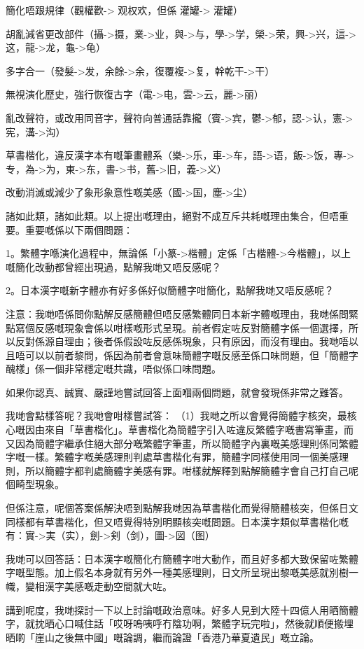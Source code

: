 \documentclass[a5paper, 10pt, openany]{book} %
\begin{document}
簡化唔跟規律（觀權歡-> 观权欢，但係 灌罐-> 灌罐）

胡亂減省更改部件（攝->摄，業->业，與->与，學->学，榮->荣，興->兴，這->这，龍->龙，龜->龟）

多字合一（發髮->发，余餘->余，復覆複->复，幹乾干->干）

無視演化歷史，強行恢復古字（電->电，雲->云，麗->丽）

亂改聲符，或改用同音字，聲符向普通話靠攏（賓->宾，鬱->郁，認->认，憲->宪，溝->沟）

草書楷化，違反漢字本有嘅筆畫體系（樂->乐，車->车，語->语，飯->饭，專->专，為->为，東->东，書->书，舊->旧，義->义）

改動消滅或減少了象形象意性嘅美感（國->国，塵->尘）

諸如此類，諸如此類。以上提出嘅理由，絕對不成互斥共耗嘅理由集合，但唔重要。重要嘅係以下兩個問題：

1。繁體字喺演化過程中，無論係「小篆->楷體」定係「古楷體->今楷體」，以上嘅簡化改動都曾經出現過，點解我哋又唔反感呢？

2。日本漢字嘅新字體亦有好多係好似簡體字咁簡化，點解我哋又唔反感呢？

注意：我哋唔係問你點解反感簡體但唔反感繁體同日本新字體嘅理由，我哋係問緊點寫個反感嘅現象會係以咁樣嘅形式呈現。前者假定咗反對簡體字係一個選擇，所以反對係源自理由；後者係假設咗反感係現象，只有原因，而沒有理由。我哋唔以且唔可以以前者黎問，係因為前者會意味簡體字嘅反感至係口味問題，但「簡體字醜樣」係一個非常穩定嘅共識，唔似係口味問題。

如果你認真、誠實、嚴謹地嘗試回答上面嗰兩個問題，就會發現係非常之難答。

我哋會點樣答呢？我哋會咁樣嘗試答：
（1）我哋之所以會覺得簡體字核突，最核心嘅因由來自「草書楷化」。草書楷化為簡體字引入咗違反繁體字嘅書寫筆畫，而又因為簡體字繼承住絕大部分嘅繁體字筆畫，所以簡體字內裏嘅美感理則係同繁體字嘅一樣。繁體字嘅美感理則判處草書楷化有罪，簡體字同樣使用同一個美感理則，所以簡體字都判處簡體字美感有罪。咁樣就解釋到點解簡體字會自己打自己呢個畸型現象。

但係注意，呢個答案係解決唔到點解我哋因為草書楷化而覺得簡體核突，但係日文同樣都有草書楷化，但又唔覺得特別明顯核突嘅問題。日本漢字類似草書楷化嘅有：實->実（实），劍->剣（剑），圖->図（图）

我哋可以回答話：日本漢字嘅簡化冇簡體字咁大動作，而且好多都大致保留咗繁體字嘅型態。加上假名本身就有另外一種美感理則，日文所呈現出黎嘅美感就別樹一幟，變相漢字美感嘅走動空間就大咗。

講到呢度，我哋探討一下以上討論嘅政治意味。好多人見到大陸十四億人用晒簡體字，就抌晒心口喊住話「哎呀嗚咦呼冇陰功啊，繁體字玩完啦」，然後就順便搬埋晒啲「崖山之後無中國」嘅論調，繼而論證「香港乃華夏遺民」嘅立論。
\end{document}
